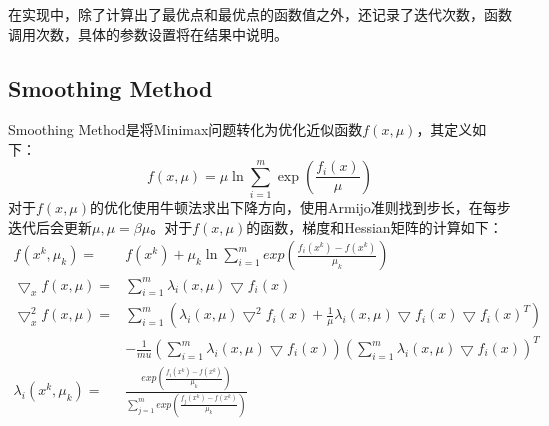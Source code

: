 \documentclass{ctexart}
\begin{document}
在实现中，除了计算出了最优点和最优点的函数值之外，还记录了迭代次数，函数调用次数，具体的参数设置将在结果中说明。
\subsection{Smoothing Method}
Smoothing Method是将Minimax问题转化为优化近似函数$f(x,\mu)$，其定义如下：
\[f(x,\mu) = \mu\ln\sum_{i=1}^{m}{\exp(\frac{f_i(x)}{\mu})}\]
对于$f(x,\mu)$的优化使用牛顿法求出下降方向，使用Armijo准则找到步长，在每步迭代后会更新$\mu, \mu = \beta\mu$。对于$f(x,\mu)$的函数，梯度和Hessian矩阵的计算如下：
$$
\begin{aligned}
	f(x^k,\mu_k)=&f(x^k)+\mu_k\ln\sum_{i=1}^{m}{exp(\frac{f_i(x^k)-f(x^k)}{\mu_k})}\\
	\bigtriangledown_xf(x,\mu)=&\sum_{i=1}^m{\lambda_i(x,\mu)\bigtriangledown f_i(x)}\\
\bigtriangledown^2_xf(x,\mu)=&\sum_{i=1}^m(\lambda_i(x,\mu)\bigtriangledown^2f_i(x)+\frac{1}{\mu}\lambda_i(x,\mu)\bigtriangledown f_i(x)\bigtriangledown f_i(x)^T)\\
			& -\frac{1}{mu}(\sum_{i=1}^{m}\lambda_i(x,\mu)\bigtriangledown f_i(x))(\sum_{i=1}^m{\lambda_i(x,\mu)\bigtriangledown f_i(x)})^T\\
	\lambda_i(x^k,\mu_k) =& \frac{exp(\frac{f_i(x^k)-f(x^k)}{\mu_k})}{\sum_{j=1}^{m}{exp(\frac{f_j(x^k)-f(x^k)}{\mu_k})}}
\end{aligned}
$$
\end{document}
